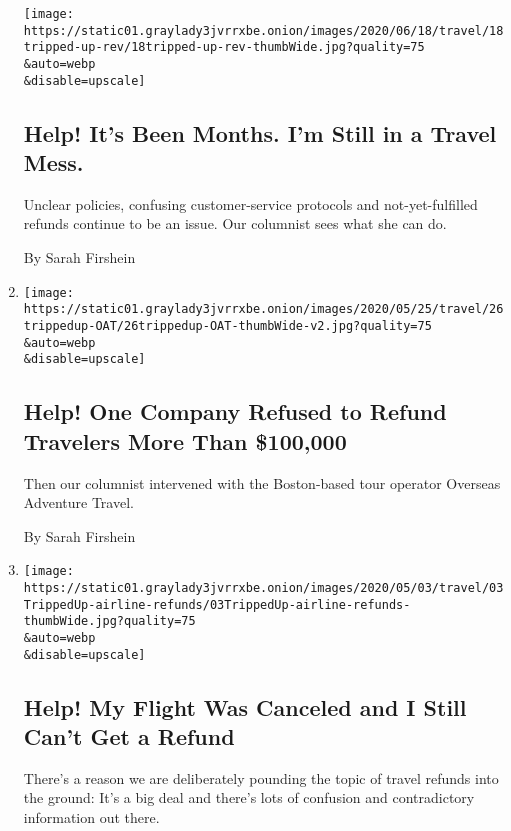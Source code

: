 \begin{enumerate}
  \texttt{[image: https://static01.graylady3jvrrxbe.onion/images/2020/06/18/travel/18tripped-up-rev/18tripped-up-rev-thumbWide.jpg?quality=75\\\&auto=webp\\\&disable=upscale]}

  \hypertarget{help-its-been-months-im-still-in-a-travel-mess}{%
  \subsection{Help! It's Been Months. I'm Still in a Travel
  Mess.}\label{help-its-been-months-im-still-in-a-travel-mess}}

  Unclear policies, confusing customer-service protocols and
  not-yet-fulfilled refunds continue to be an issue. Our columnist sees
  what she can do.

  By Sarah Firshein
\item
  \href{/2020/05/25/travel/coronavirus-refunds-overseas-adventure-travel.html}{}

  \texttt{[image: https://static01.graylady3jvrrxbe.onion/images/2020/05/25/travel/26trippedup-OAT/26trippedup-OAT-thumbWide-v2.jpg?quality=75\\\&auto=webp\\\&disable=upscale]}

  \hypertarget{help-one-company-refused-to-refund-travelers-more-than-100000}{%
  \subsection{Help! One Company Refused to Refund Travelers More Than
  \$100,000}\label{help-one-company-refused-to-refund-travelers-more-than-100000}}

  Then our columnist intervened with the Boston-based tour operator
  Overseas Adventure Travel.

  By Sarah Firshein
\item
  \href{/2020/05/01/travel/trip-refund-airlines.html}{}

  \texttt{[image: https://static01.graylady3jvrrxbe.onion/images/2020/05/03/travel/03TrippedUp-airline-refunds/03TrippedUp-airline-refunds-thumbWide.jpg?quality=75\\\&auto=webp\\\&disable=upscale]}

  \hypertarget{help-my-flight-was-canceled-and-i-still-cant-get-a-refund}{%
  \subsection{Help! My Flight Was Canceled and I Still Can't Get a
  Refund}\label{help-my-flight-was-canceled-and-i-still-cant-get-a-refund}}

  There's a reason we are deliberately pounding the topic of travel
  refunds into the ground: It's a big deal and there's lots of confusion
  and contradictory information out there.


\end{enumerate}
